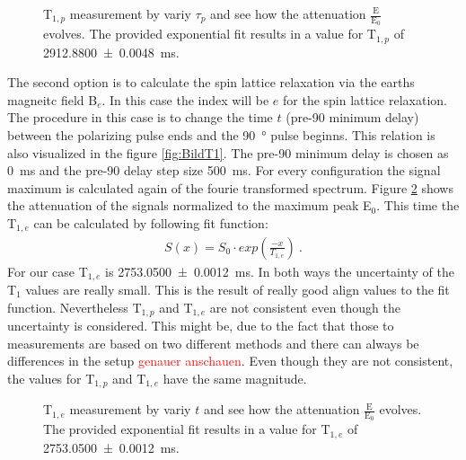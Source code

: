 \begin{figure}[H]
    \centering
    
    \caption[T$_{1,p}$ measurement by variy $\tau_p$ and see how the attenuation $\frac{\text{E}}{\text{E}_0}$ evolves.]{T$_{1,p}$ measurement by variy $\tau_p$ and see how the attenuation $\frac{\text{E}}{\text{E}_0}$ evolves. The provided exponential fit results in a value for T$_{1,p}$ of \SI{2912.8800 \pm 0.0048}{\milli \second}.}
    \label{fig:T1Polarisationsfeldfeld}
\end{figure}

The second option is to calculate the spin lattice relaxation via the earths magneitc field B$_e$. In this case the index will be $e$ for the spin lattice relaxation. The procedure in this case is to change the time $t$ (pre-90 minimum delay) between the polarizing pulse ends and the \SI{90}{\degree} pulse beginns. This relation is also visualized in the figure \ref{fig:BildT1}. The pre-90 minimum delay is chosen as \SI{0}{\milli \second} and the pre-90 delay step size \SI{500}{\milli \second}. For every configuration the signal maximum is calculated again of the fourie transformed spectrum. Figure \ref{fig:T1Erdmagnetfeld} shows the attenuation of the signals normalized to the maximum peak E$_0$. This time the T$_{1,e}$ can be calculated by following fit function:
\begin{align}
    S(x) = S_0 \cdot exp(\frac{-x}{T_{1,e}}) \ .
    \label{eq: fitBe}
\end{align}
For our case T$_{1,e}$ is \SI{2753.0500 \pm 0.0012}{\milli \second}.\newline
In both ways the uncertainty of the T$_1$ values are really small. This is the result of really good align values to the fit function. Nevertheless T$_{1,p}$ and T$_{1,e}$ are not consistent even though the uncertainty is considered. This might be, due to the fact that those to measurements are based on two different methods and there can always be differences in the setup \textcolor{red}{genauer anschauen}. Even though they are not consistent, the values for T$_{1,p}$ and T$_{1,e}$ have the same magnitude.
\begin{figure}[H]
    \centering
    
    \caption[T$_{1,e}$ measurement by variy $t$ and see how the attenuation $\frac{\text{E}}{\text{E}_0}$ evolves.]{T$_{1,e}$ measurement by variy $t$ and see how the attenuation $\frac{\text{E}}{\text{E}_0}$ evolves. The provided exponential fit results in a value for T$_{1,e}$ of \SI{2753.0500 \pm 0.0012}{\milli \second}.}
    \label{fig:T1Erdmagnetfeld}
\end{figure}
